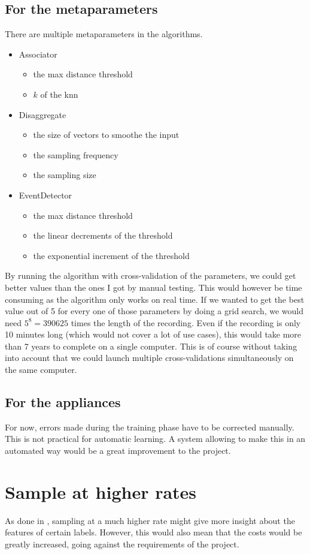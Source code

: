 \subsection{For the metaparameters}
There are multiple metaparameters in the algorithms.
\begin{itemize}
    \item Associator \begin{itemize}
        \item the max distance threshold
        \item $k$ of the \acrshort{knn}
    \end{itemize}
    \item Disaggregate \begin{itemize}
        \item the size of vectors to smoothe the input
        \item the sampling frequency
        \item the sampling size
    \end{itemize}
    \item EventDetector \begin{itemize}
        \item the max distance threshold
        \item the linear decrements of the threshold
        \item the exponential increment of the threshold
    \end{itemize}
\end{itemize}
By running the algorithm with cross-validation of the parameters, we could get better values than the ones I got by manual testing. This would however be time consuming as the algorithm only works on real time. If we wanted to get the best value out of 5 for every one of those parameters by doing a grid search, we would need $5^8=390625$ times the length of the recording. Even if the recording is only 10 minutes long (which would not cover a lot of use cases), this would take more than 7 years to complete on a single computer. This is of course without taking into account that we could launch multiple cross-validations simultaneously on the same computer.

\subsection{For the appliances}
For now, errors made during the training phase have to be corrected manually. This is not practical for automatic learning. A system allowing to make this in an automated way would be a great improvement to the project.

\section{Sample at higher rates}
As done in \cite{gupta2010electrisense}, sampling at a much higher rate might give more insight about the features of certain labels. However, this would also mean that the costs would be greatly increased, going against the requirements of the project.
